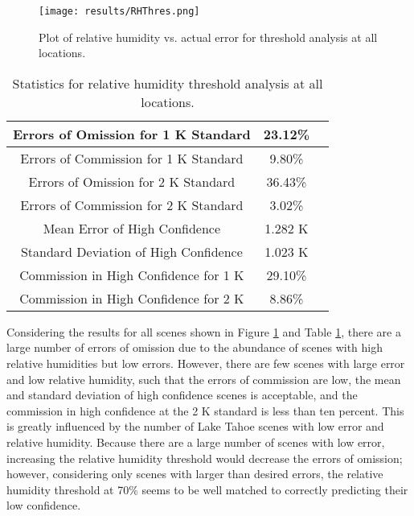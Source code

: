 \documentclass{book}
\begin{document}
\begin{minipage}[c]{0.47\textwidth}
\centering
\begin{figure}[H]
\texttt{[image: results/RHThres.png]}
\caption{Plot of relative humidity vs. actual error for threshold analysis at all locations.}
\label{fig:RHThres}
\end{figure}
\end{minipage}
\begin{minipage}[c]{0.47\textwidth}
\begin{table}[H]
\centering
\footnotesize
\begin{tabular}{ | c | c | c | } \hline
Errors of Omission for 1 K Standard & 23.12\% \\ \hline
Errors of Commission for 1 K Standard & 9.80\% \\ \hline
Errors of Omission for 2 K Standard & 36.43\% \\ \hline
Errors of Commission for 2 K Standard & 3.02\% \\ \hline
Mean Error of High Confidence & 1.282 K \\ \hline
Standard Deviation of High Confidence & 1.023 K \\ \hline
Commission in High Confidence for 1 K & 29.10\% \\ \hline
Commission in High Confidence for 2 K & 8.86\% \\ \hline
\end{tabular}
\caption{Statistics for relative humidity threshold analysis at all locations.}
\label{tab:RHThres}
\end{table}
\end{minipage}

Considering the results for all scenes shown in Figure \ref{fig:RHThres} and Table \ref{tab:RHThres}, there are a large number of errors of omission due to the abundance of scenes with high relative humidities but low errors.  However, there are few scenes with large error and low relative humidity, such that the errors of commission are low, the mean and standard deviation of high confidence scenes is acceptable, and the commission in high confidence at the 2 K standard is less than ten percent.  This is greatly influenced by the number of Lake Tahoe scenes with low error and relative humidity.  Because there are a large number of scenes with low error, increasing the relative humidity threshold would decrease the errors of omission; however, considering only scenes with larger than desired errors, the relative humidity threshold at 70\% seems to be well matched to correctly predicting their low confidence.
\end{document}
